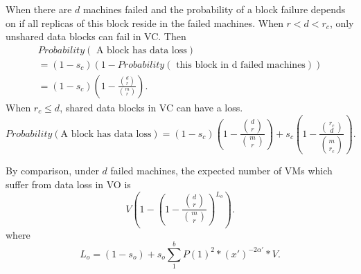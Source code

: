 {%

When there are $d$ machines failed and the probability of
a block failure depends on if all replicas of this block reside in the failed machines.
When $r< d <r_c$,  only unshared data blocks can fail in VC. Then
\begin{multline}
Probability(\mbox{ A block has data loss})\\
= (1-s_c) (1- Probability (\mbox{ this block in d failed machines}))\\
= (1-s_c) (1- \frac{ \binom{d}{r}} { \binom{m}{r} }).
\end{multline}
When $r_c \leq d$, shared data blocks in VC can have a loss. 
\[
Probability(\mbox{A block has data loss})
= 
(1-s_c) (1- \frac{ \binom{d}{r}} { \binom{m}{r} })
+ s_c (1- \frac{ \binom{r_c}{d}} { \binom{m}{r_c} }).
\]

By comparison, under $d$ failed machines, the  expected number of VMs 
which suffer from data loss in VO is
\[
V ( 1-  (1- \frac{ \binom{d}{r}} { \binom{m}{r} })^{L_o} ).
\]
where
\[
L_o = (1-s_o) + s_o \sum_1^b  P(1)^2 *  (x')^{-2\alpha'} *V.  
\]

}


